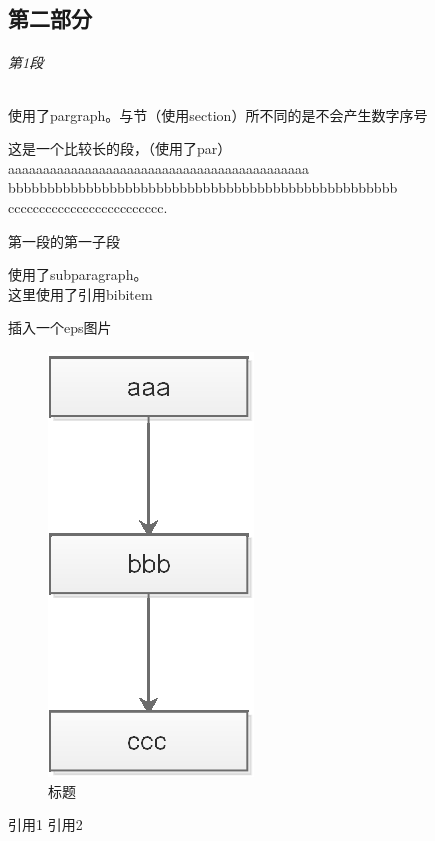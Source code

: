 \documentclass{article}
\begin{document}
\begin{CJK}{UTF8}{gbsn}
	\part{第二部分}
	\paragraph{第1段} 使用了pargraph。与节（使用section）所不同的是不会产生数字序号
	\par
	这是一个比较长的段，（使用了par）aaaaaaaaaaaaaaaaaaaaaaaaaaaaaaaaaaaaaaaaaaa\\
	bbbbbbbbbbbbbbbbbbbbbbbbbbbbbbbbbbbbbbbbbbbbbbbbbb\\
	ccccccccccccccccccccccccc.
	\subparagraph{第一段的第一子段}  使用了subparagraph。\\
	这里使用了引用bibitem \cite{JW2}
	\par 
	插入一个eps图片\\
	\begin{figure}[H]
	\centering
	\includegraphics{test.eps}
	\caption{标题}
	\label{1}
	\end{figure}
	\begin{thebibliography}{2}
			引用1
			引用2
	\end{thebibliography}

	\printindex
\end{CJK}
\end{document}
